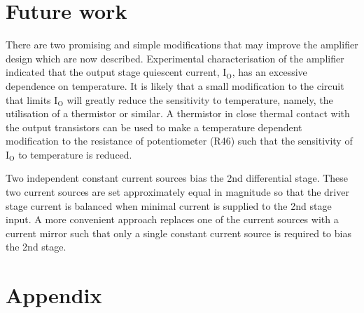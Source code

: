\documentclass[a4paper,10pt, oneside]{article}
\begin{document}
\section{Future work}\label{sec:future}
There are two promising and simple modifications that may improve the amplifier design which are now described. 
Experimental characterisation of the amplifier indicated that the output stage quiescent current, $\textrm{I}_{\textrm{O}}$, has an excessive dependence on temperature. It is likely that a small modification to the circuit that limits $\textrm{I}_{\textrm{O}}$ will greatly reduce the sensitivity to temperature, namely, the utilisation of a thermistor or similar. A thermistor in close thermal contact with the output transistors can be used to make a temperature dependent modification to the resistance of potentiometer (R46) such that the sensitivity of $\textrm{I}_{\textrm{O}}$ to temperature is reduced. 

Two independent constant current sources bias the 2nd differential stage. These two current sources are set approximately equal in magnitude so that the driver stage current is balanced when minimal current is supplied to the 2nd stage input. A more convenient approach replaces one of the current sources with a current mirror such that only a single constant current source is required to bias the 2nd stage. 


\section{Appendix}\label{sec:appendix}
\end{document}
